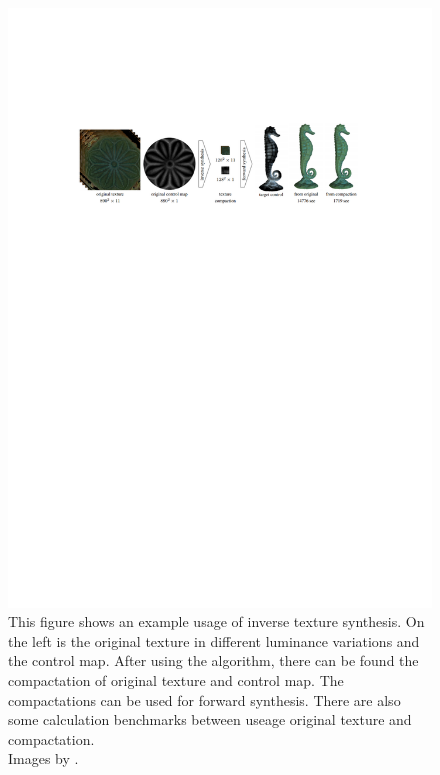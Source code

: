 \begin{figure}[h]
\centering
\includegraphics[scale=1]{img/its-example}
\caption[Inverse texture synthesis example]{This figure shows an example usage of inverse texture synthesis. On the left is the original texture in different luminance variations and the control map. After using the algorithm, there can be found the compactation of original texture and control map. The compactations can be used for forward synthesis. There are also some calculation benchmarks between useage original texture and compactation.\\ Images by \cite{its}.}
\label{fig:Inverse texture synthesis example}
\end{figure}


